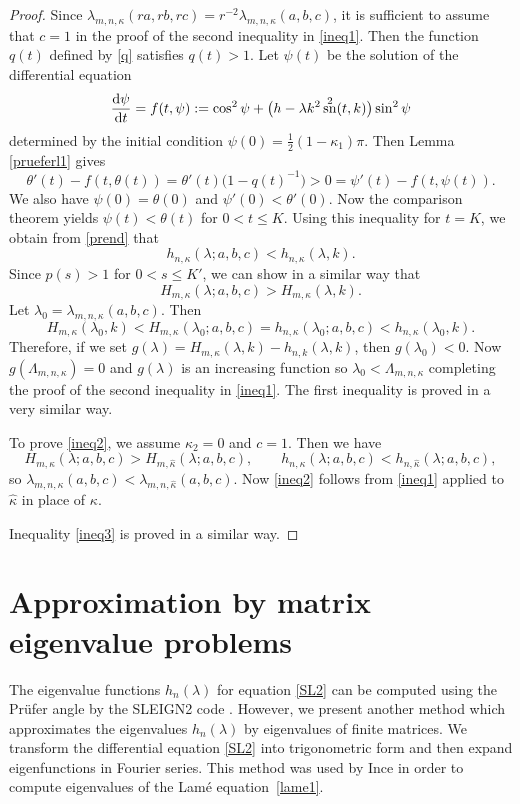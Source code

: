 \documentclass[pdftex]{sigma}
\newcommand{\RS}[1]{\textcolor{red}{#1}}
\DeclareMathOperator{\sn}{sn}
\numberwithin{equation}{section}
\begin{document}
\begin{proof}
Since $\lambda_{m,n,\kappa}(ra,rb,rc)=r^{-2} \lambda_{m,n,\kappa}(a,b,c)$, it is sufficient to assume that $c=1$
in the proof of the second inequality in \eqref{ineq1}.
Then the function $q(t)$ defined by \eqref{q} satisfies $q(t)>1$.
Let $\psi(t)$ be the solution of the differential equation
\begin{equation*}%
\frac{{\rm d}\psi}{{\rm d}t}= f(t,\psi):=\cos^2\psi+\bigl(h-\lambda k^2\sn^2(t,k)\bigr)\sin^2\psi
\end{equation*}
determined by the initial condition $\psi(0)=\frac12(1-\kappa_1)\pi$.
Then Lemma \ref{prueferl1} gives
\[\theta'(t)-f(t,\theta(t))=\theta'(t)\bigl(1-q(t)^{-1}\bigr)>0=\psi'(t)-f(t,\psi(t)).\]
We also have $\psi(0)=\theta(0)$ and $\psi'(0)<\theta'(0)$. Now the comparison theorem \RS{\cite[?????~II.9.III]{WW}} yields $\psi(t)<\theta(t)$
for $0<t\le K$.
Using this inequality for $t=K$, we obtain from \eqref{prend} that
\[ h_{n,\kappa}(\lambda;a,b,c)< h_{n,\kappa}(\lambda,k) .\]
Since $p(s)>1$ for $0<s\le K'$, we can show in a similar way that
\[ H_{m,\kappa}(\lambda;a,b,c)> H_{m,\kappa}(\lambda,k).\]
Let $\lambda_0=\lambda_{m,n,\kappa}(a,b,c)$. Then
\[ H_{m,\kappa}(\lambda_0,k)<H_{m,\kappa}(\lambda_0;a, b,c)=h_{n,\kappa}(\lambda_0;a,b,c)<h_{n,\kappa}(\lambda_0,k) .\]
Therefore, if we set $g(\lambda)=H_{m,\kappa}(\lambda,k)-h_{n,k}(\lambda,k)$, then $g(\lambda_0)<0$. Now $g(\Lambda_{m,n,\kappa})=0$ and $g(\lambda)$ is an increasing function so
$\lambda_0<\Lambda_{m,n,\kappa}$ completing the proof of the second inequality in \eqref{ineq1}.
The first inequality is proved in a very similar way.

To prove \eqref{ineq2}, we assume $\kappa_2=0$ and $c=1$. Then we have
\[ H_{m,\kappa}(\lambda;a,b,c)>H_{m,\hat\kappa}(\lambda;a,b,c),\qquad h_{n,\kappa}(\lambda;a,b,c)<h_{n,\hat\kappa}(\lambda;a,b,c),
\]
so $\lambda_{m,n,\kappa}(a,b,c)<\lambda_{m,n,\hat\kappa}(a,b,c)$.
Now \eqref{ineq2} follows from \eqref{ineq1} applied to $\hat\kappa$ in place of $\kappa$.

Inequality \eqref{ineq3} is proved in a similar way.
\end{proof}

\section{Approximation by matrix eigenvalue problems}\label{matrix}

The eigenvalue functions $h_n(\lambda)$ for equation \eqref{SL2} can be computed using the Pr\"ufer angle by the
SLEIGN2 code \cite{BEZ}. However, we present another method which approximates the eigenvalues $h_n(\lambda)$ by
eigenvalues of finite matrices.
We transform the differential equation \eqref{SL2} into trigonometric form and then expand
eigenfunctions in Fourier series.
This method was used by Ince \cite{I.FIP} in order to compute eigenvalues of the Lam\'e equation~\eqref{lame1}.
\end{document}
